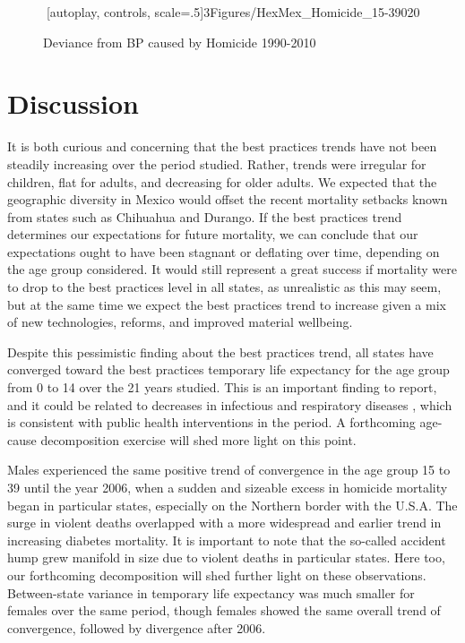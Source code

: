 \documentclass{article}
\begin{document}
\begin{figure}
\centering
\caption{Deviance from BP caused by Homicide 1990-2010}
\animategraphics[autoplay, controls, scale=.5]{3}{Figures/HexMex_Homicide_15-39}{0}{20}
\end{figure}





\section*{Discussion}
It is both curious and concerning that the best practices trends have not been
steadily increasing over the period studied. Rather, trends were irregular for
children, flat for adults, and decreasing for older adults. We expected
that the geographic diversity in Mexico would offset the recent mortality
setbacks known from states such as Chihuahua and Durango. If the best practices
trend determines our expectations for future mortality, we can conclude that
our expectations ought to have been stagnant or deflating over time, depending
on the age group considered. It would still represent a great success if
mortality were to drop to the best practices level in all states, as unrealistic as this may seem, but at the same time we expect
the best practices trend to increase given a mix of new technologies, reforms,
and improved material wellbeing.

Despite this pessimistic finding about the best practices trend, all states have
converged toward the best practices temporary life expectancy for the age group
from 0 to 14 over the 21 years studied. This is an important finding to report,
and it could be related to decreases in infectious and respiratory diseases
\citep{canudas2014}, which is consistent with public health
interventions in the period. A forthcoming age-cause decomposition exercise will
shed more light on this point.

Males experienced the same positive trend of convergence in the age group 15 to
39 until the year 2006, when a sudden and sizeable excess in homicide mortality
began in particular states, especially on the Northern border with the U.S.A.
The surge in violent deaths overlapped with a more widespread and earlier
trend in increasing diabetes mortality. It is important to note that the
so-called accident hump grew manifold in size due to violent deaths in
particular states. Here too, our forthcoming decomposition
will shed further light on these observations. Between-state variance in
temporary life expectancy was much smaller for females over the same period,
though females showed the same overall trend of convergence, followed by
divergence after 2006.
\end{document}
